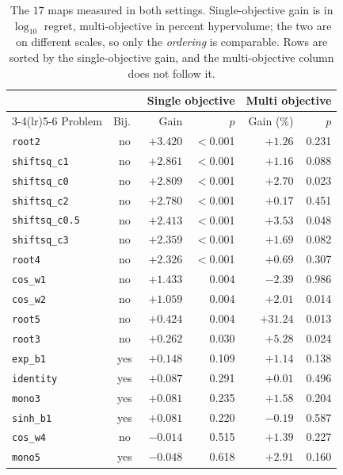 \begin{table}[H]
\centering
\small
\caption{The $17$ maps measured in both settings. Single-objective gain is in $\log_{10}$ regret, multi-objective in percent hypervolume; the two are on different scales, so only the \emph{ordering} is comparable. Rows are sorted by the single-objective gain, and the multi-objective column does not follow it.}
\label{tab:matched}
\begin{tabular}{l c r r r r}
\toprule
 & & \multicolumn{2}{c}{Single objective} & \multicolumn{2}{c}{Multi objective} \\
\cmidrule(lr){3-4}\cmidrule(lr){5-6}
Problem & Bij.\ & Gain & $p$ & Gain (\%) & $p$ \\
\midrule
\texttt{root2} & no & $+3.420$ & $<$0.001 & $+1.26$ & 0.231 \\
\texttt{shiftsq\_c1} & no & $+2.861$ & $<$0.001 & $+1.16$ & 0.088 \\
\texttt{shiftsq\_c0} & no & $+2.809$ & $<$0.001 & $+2.70$ & 0.023 \\
\texttt{shiftsq\_c2} & no & $+2.780$ & $<$0.001 & $+0.17$ & 0.451 \\
\texttt{shiftsq\_c0.5} & no & $+2.413$ & $<$0.001 & $+3.53$ & 0.048 \\
\texttt{shiftsq\_c3} & no & $+2.359$ & $<$0.001 & $+1.69$ & 0.082 \\
\texttt{root4} & no & $+2.326$ & $<$0.001 & $+0.69$ & 0.307 \\
\texttt{cos\_w1} & no & $+1.433$ & 0.004 & $-2.39$ & 0.986 \\
\texttt{cos\_w2} & no & $+1.059$ & 0.004 & $+2.01$ & 0.014 \\
\texttt{root5} & no & $+0.424$ & 0.004 & $+31.24$ & 0.013 \\
\texttt{root3} & no & $+0.262$ & 0.030 & $+5.28$ & 0.024 \\
\texttt{exp\_b1} & yes & $+0.148$ & 0.109 & $+1.14$ & 0.138 \\
\texttt{identity} & yes & $+0.087$ & 0.291 & $+0.01$ & 0.496 \\
\texttt{mono3} & yes & $+0.081$ & 0.235 & $+1.58$ & 0.204 \\
\texttt{sinh\_b1} & yes & $+0.081$ & 0.220 & $-0.19$ & 0.587 \\
\texttt{cos\_w4} & no & $-0.014$ & 0.515 & $+1.39$ & 0.227 \\
\texttt{mono5} & yes & $-0.048$ & 0.618 & $+2.91$ & 0.160 \\
\bottomrule
\end{tabular}
\end{table}
